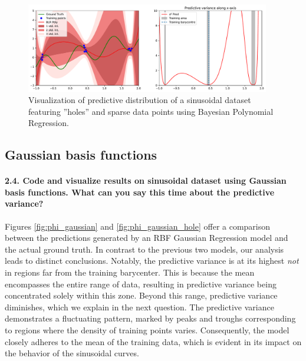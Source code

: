 \begin{figure}[H]
    \centering
    \includegraphics[width=0.95\textwidth]{phi_polynomial_hole.pdf}
    \caption{Visualization of predictive distribution of a sinusoidal dataset featuring ''holes'' and sparse data points using Bayesian Polynomial Regression.}
    \label{fig:phi_polynomial_hole}
\end{figure}

\subsection{Gaussian basis functions}

\paragraph*{2.4. Code and visualize results on sinusoidal dataset using Gaussian basis functions. What can you say this time about the predictive variance?}

Figures \ref{fig:phi_gaussian} and \ref{fig:phi_gaussian_hole} offer a comparison between the predictions generated by an RBF Gaussian Regression model and the actual ground truth. In contrast to the previous two models, our analysis leads to distinct conclusions. Notably, the predictive variance is at its highest \textit{not} in regions far from the training barycenter. This is because the mean encompasses the entire range of data, resulting in predictive variance being concentrated solely within this zone. Beyond this range, predictive variance diminishes, which we explain in the next question. The predictive variance demonstrates a fluctuating pattern, marked by peaks and troughs corresponding to regions where the density of training points varies. Consequently, the model closely adheres to the mean of the training data, which is evident in its impact on the behavior of the sinusoidal curves.


